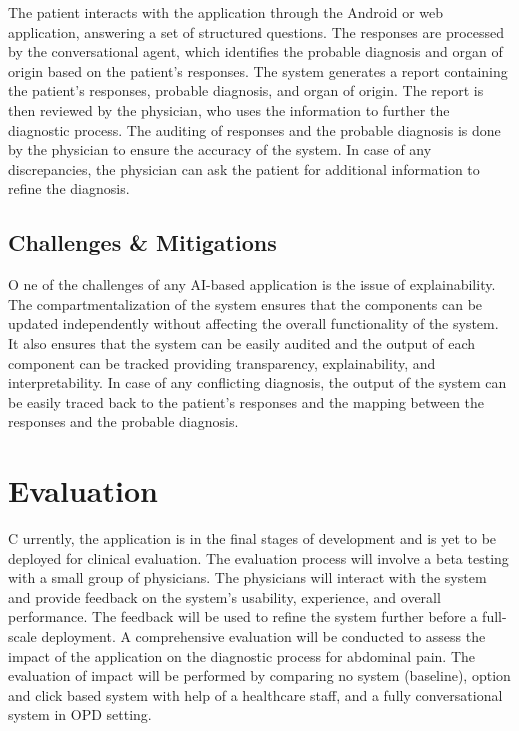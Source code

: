 \noindent The patient interacts with the application through the Android or web application, answering a set of structured questions. The responses are processed by the conversational agent, which identifies the probable diagnosis and organ of origin based on the patient's responses. The system generates a report containing the patient's responses, probable diagnosis, and organ of origin. The report is then reviewed by the physician, who uses the information to further the diagnostic process. The auditing of responses and the probable diagnosis is done by the physician to ensure the accuracy of the system. In case of any discrepancies, the physician can ask the patient for additional information to refine the diagnosis.

\subsection{Challenges \& Mitigations}
\lettrine{O}{ }ne of the challenges of any AI-based application is the issue of explainability. The compartmentalization of the system ensures that the components can be updated independently without affecting the overall functionality of the system. It also ensures that the system can be easily audited and the output of each component can be tracked providing transparency, explainability, and interpretability. In case of any conflicting diagnosis, the output of the system can be easily traced back to the patient's responses and the mapping between the responses and the probable diagnosis.


\section{Evaluation}
\lettrine{C}{ }urrently, the application is in the final stages of development and is yet to be deployed for clinical evaluation. The evaluation process will involve a beta testing with a small group of physicians. The physicians will interact with the system and provide feedback on the system's usability, experience, and overall performance. The feedback will be used to refine the system further before a full-scale deployment. A comprehensive evaluation will be conducted to assess the impact of the application on the diagnostic process for abdominal pain. The evaluation of impact will be performed by comparing no system (baseline), option and click based system with help of a healthcare staff, and a fully conversational system in OPD setting.\\[\baselineskip]
